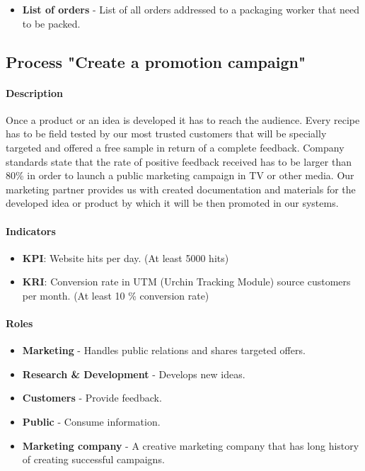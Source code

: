 \documentclass[11pt,a4paper]{article}
\begin{document}
\begin{itemize}
    \item \textbf{List of orders} - List of all orders addressed to a packaging worker that need to be packed.
\end{itemize}

\newpage




\subsection{Process "Create a promotion campaign"}

\paragraph{Description}
Once a product or an idea is developed it has to reach the audience. Every recipe has to be field tested by our most trusted customers that will be specially targeted and offered a free sample in return of a complete feedback. Company standards state that the rate of positive feedback received has to be larger than 80\% in order to launch a public marketing campaign in TV or other media. Our marketing partner provides us with created documentation and materials for the developed idea or product by which it will be then promoted in our systems.

\paragraph{Indicators}

\begin{itemize}
    \item \textbf{KPI}: Website hits per day. (At least 5000 hits)
    \item \textbf{KRI}: Conversion rate in UTM (Urchin Tracking Module) source customers per month. (At least 10 \% conversion rate)
\end{itemize}

\paragraph{Roles}

\begin{itemize}
    \item \textbf{Marketing} - Handles public relations and shares targeted offers.
    \item \textbf{Research \& Development} - Develops new ideas.
    \item \textbf{Customers} - Provide feedback.
    \item \textbf{Public} - Consume information.
    \item \textbf{Marketing company} - A creative marketing company that has long history of creating successful campaigns.
\end{itemize}
\end{document}

